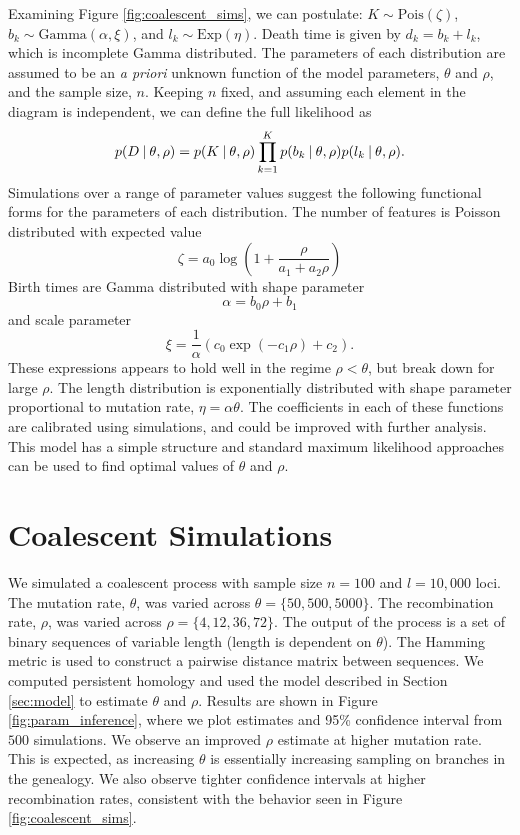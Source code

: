 Examining Figure \ref{fig:coalescent_sims}, we can postulate: $K \sim \mathrm{Pois}(\zeta)$, $b_k \sim \mathrm{Gamma}(\alpha,\xi)$, and $l_k \sim \mathrm{Exp}(\eta)$.
Death time is given by $d_k=b_k+l_k$, which is incomplete Gamma distributed.
The parameters of each distribution are assumed to be an \emph{a priori} unknown function of the model parameters, $\theta$ and $\rho$, and the sample size, $n$.
Keeping $n$ fixed, and assuming each element in the diagram is independent, we can define the full likelihood as
\begin{equation}
p(D \:\vert\: \theta,\rho) = p(K \:\vert\: \theta,\rho)\displaystyle\prod_{k=1}^{K}p(b_k \:\vert\: \theta,\rho)p(l_k  \:\vert\: \theta,\rho).
\end{equation}
Simulations over a range of parameter values suggest the following functional forms for the parameters of each distribution.
The number of features is Poisson distributed with expected value
\begin{equation}
\zeta=a_{0}\log\left(1+\frac{\rho}{a_{1}+a_{2}\rho}\right)
\end{equation}
Birth times are Gamma distributed with shape parameter
\begin{equation}
\alpha=b_{0}\rho+b_{1}
\end{equation}
and scale parameter
\begin{equation}
\xi = \frac{1}{\alpha}(c_{0}\exp(-c_{1}\rho)+c_{2}).
\end{equation}
These expressions appears to hold well in the regime $\rho<\theta$, but break down for large $\rho$.
The length distribution is exponentially distributed with shape parameter proportional to mutation rate, $\eta=\alpha\theta$.
The coefficients in each of these functions are calibrated using simulations, and could be improved with further analysis.
This model has a simple structure and standard maximum likelihood approaches can be used to find optimal values of $\theta$ and $\rho$.

\section{Coalescent Simulations}
\label{parametric_inference:simulations}

We simulated a coalescent process with sample size $n=100$ and $l=10{,}000$ loci.
The mutation rate, $\theta$, was varied across $\theta=\{50,500,5000\}$.
The recombination rate, $\rho$, was varied across $\rho=\{4,12,36,72\}$.
The output of the process is a set of binary sequences of variable length (length is dependent on $\theta$).
The Hamming metric is used to construct a pairwise distance matrix between sequences.
We computed persistent homology and used the model described in Section \ref{sec:model} to estimate $\theta$ and $\rho$.
Results are shown in Figure \ref{fig:param_inference}, where we plot estimates and 95\% confidence interval from $500$ simulations.
We observe an improved $\rho$ estimate at higher mutation rate.
This is expected, as increasing $\theta$ is essentially increasing sampling on branches in the genealogy.
We also observe tighter confidence intervals at higher recombination rates, consistent with the behavior seen in Figure \ref{fig:coalescent_sims}.

